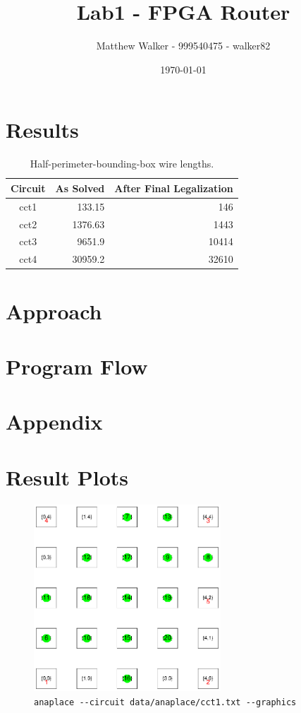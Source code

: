 \documentclass[11pt]{article}
\title{Lab1 - FPGA Router}
\author{Matthew Walker - 999540475 - walker82}
\date{\today}
\begin{document}
\maketitle

\section{Results}
\begin{table}[ht]
\centering\begin{tabular}{ c *2r}
\hline\hline
Circuit & As Solved & After Final Legalization \\
\hline
cct1 & 133.15 & 146 \\
cct2 & 1376.63 & 1443 \\
cct3 & 9651.9 & 10414 \\
cct4 & 30959.2 & 32610 \\
\hline\hline
\end{tabular}
\caption{Half-perimeter-bounding-box wire lengths. \label{tab:hpbbwl}}
\end{table}

\section{Approach}


\section{Program Flow}

\clearpage
\appendix
\section*{Appendix}

\section{Result Plots}\label{app:result-plots}
\begin{figure}[H]
\centering
\includegraphics[clip, viewport=213 280 443 510, width=7cm]{assets/lab2/cct1-legalized.ps}
\cprotect\caption{\small\verb|anaplace --circuit data/anaplace/cct1.txt --graphics|}
\end{figure}
\end{document}
